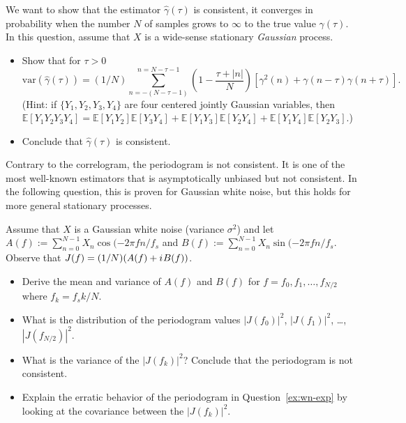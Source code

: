 \documentclass[11pt]{article}
\begin{document}
\begin{solution}
    
\end{solution}

\begin{exercise}
    We want to show that the estimator $\hat{\gamma}(\tau)$ is consistent, \ie it converges in probability when the number $N$ of samples grows to $\infty$ to the true value ${\gamma}(\tau)$.
    In this question, assume that $X$ is a wide-sense stationary \textit{Gaussian} process.
    \begin{itemize}
        \item Show that for $\tau>0$ 
    \begin{equation}
       \text{var}(\hat{\gamma}(\tau)) = (1/N) \sum_{n=-(N-\tau-1)}^{n=N-\tau-1} \left(1 - \frac{\tau + |n|}{N}\right) \left[\gamma^2(n) + \gamma(n-\tau)\gamma(n+\tau)\right].
    \end{equation}
    (Hint: if $\{Y_1, Y_2, Y_3, Y_4\}$ are four centered jointly Gaussian variables, then $\mathbb{E}[Y_1 Y_2 Y_3 Y_4] = \mathbb{E}[Y_1 Y_2]\mathbb{E}[Y_3 Y_4] + \mathbb{E}[Y_1 Y_3]\mathbb{E}[Y_2 Y_4] + \mathbb{E}[Y_1 Y_4]\mathbb{E}[Y_2 Y_3]$.) 
    \item Conclude that $\hat{\gamma}(\tau)$ is consistent.
    \end{itemize}
\end{exercise}

\begin{solution}
    
\end{solution}

Contrary to the correlogram, the periodogram is not consistent.
It is one of the most well-known estimators that is asymptotically unbiased but not consistent.
In the following question, this is proven for Gaussian white noise, but this holds for more general stationary processes.
\begin{exercise}
    Assume that $X$ is a Gaussian white noise (variance $\sigma^2$) and let $A(f):=\sum_{n=0}^{N-1} X_n \cos(-2\pi f n/f_s$ and $B(f):=\sum_{n=0}^{N-1} X_n \sin(-2\pi f n/f_s$.
    Observe that $J(f) = (1/N) (A(f) + {i\mkern1mu} B(f))$.
    \begin{itemize}
        \item Derive the mean and variance of $A(f)$ and $B(f)$ for $f=f_0, f_1,\dots, f_{N/2}$ where $f_k=f_s k/N$.
        \item What is the distribution of the periodogram values $|J(f_0)|^2$, $|J(f_1)|^2$, \dots, $|J(f_{N/2})|^2$.
        \item What is the variance of the $|J(f_k)|^2$? Conclude that the periodogram is not consistent.
        \item Explain the erratic behavior of the periodogram in Question~\ref{ex:wn-exp} by looking at the covariance between the $|J(f_k)|^2$.
    \end{itemize}
    
\end{exercise}
\end{document}
